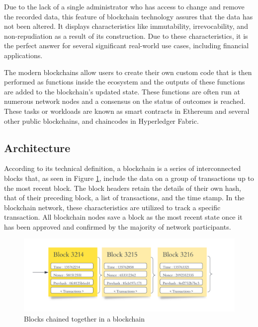 \vspace{.5cm}

Due to the lack of a single administrator who has access to change and remove the recorded data, this feature of blockchain technology assures that the data has not been altered. It displays characteristics like immutability, irrevocability, and non-repudiation as a result of its construction. Due to these characteristics, it is the perfect answer for several significant real-world use cases, including financial applications.

\vspace{.5cm}

The modern blockchains allow users to create their own custom code that is then performed as functions inside the ecosystem and the outputs of these functions are added to the blockchain's updated state. These functions are often run at numerous network nodes and a consensus on the status of outcomes is reached. These tasks or workloads are known as smart contracts in Ethereum and several other public blockchains, and chaincodes in Hyperledger Fabric.


\subsection{Architecture}
According to its technical definition, a blockchain is a series of interconnected blocks that, as seen in Figure \ref{Blocks chained together in a blockchain}, include the data on a group of transactions up to the most recent block. The block headers retain the details of their own hash, that of their preceding block, a list of transactions, and the time stamp. In the blockchain network, these characteristics are utilized to track a specific transaction. All blockchain nodes save a block as the most recent state once it has been approved and confirmed by the majority of network participants.

 \vspace{.5cm}
 
\begin{figure}[h]
  \includegraphics[width=\textwidth]{includes/figures/blocks.png}
  \caption{Blocks chained together in a blockchain \cite{bcdig}}
  \label{Blocks chained together in a blockchain}
\end{figure}

